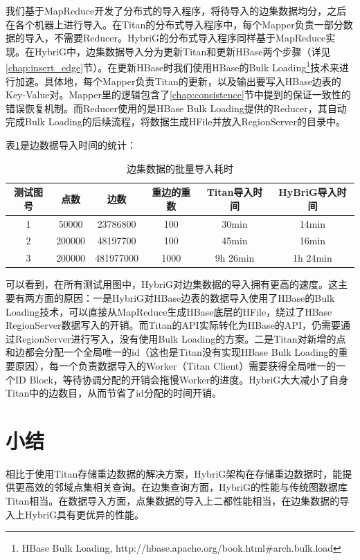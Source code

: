 我们基于MapReduce\supercite{mapreduce}开发了分布式的导入程序，将待导入的边集数据均分，之后在各个机器上进行导入。在Titan的分布式导入程序中，每个Mapper负责一部分数据的导入，不需要Reducer。HybriG的分布式导入程序同样基于MapReduce实现。在HybriG中，边集数据导入分为更新Titan和更新HBase两个步骤（详见\ref{chap:insert_edge}节）。在更新HBase时我们使用HBase的Bulk Loading\footnote{HBase Bulk Loading, http://hbase.apache.org/book.html\#arch.bulk.load}技术来进行加速。具体地，每个Mapper负责Titan的更新，以及输出要写入HBase边表的Key-Value对。Mapper里的逻辑包含了\ref{chap:consistence}节中提到的保证一致性的错误恢复机制。而Reducer使用的是HBase Bulk Loading提供的Reducer，其自动完成Bulk Loading的后续流程，将数据生成HFile并放入RegionServer的目录中。

表\ref{edge_load_perf}是边数据导入时间的统计：
\begin{table}[!hbp]
\begin{tabular}{|c|c|c|c|c|c|}
\hline
测试图号 & 点数 & 边数 & 重边的重数 & Titan导入时间 & HyBriG导入时间\\
\hline
1 & 50000 & 23786800 & 100 & 30min & 14min\\
\hline
2 & 200000 & 48197700 & 100 & 45min & 16min\\
\hline
3 & 200000 & 481977000 & 1000 & 9h 26min & 1h 24min\\
\hline
\end{tabular}
\caption{边集数据的批量导入耗时}
\label{edge_load_perf}
\end{table}

可以看到，在所有测试用图中，HybriG对边集数据的导入拥有更高的速度。这主要有两方面的原因：一是HybriG对HBase边表的数据导入使用了HBase的Bulk Loading技术，可以直接从MapReduce生成HBase底层的HFile，绕过了HBase RegionServer数据写入的开销。而Titan的API实际转化为HBase的API，仍需要通过RegionServer进行写入，没有使用Bulk Loading的方案。二是Titan对新增的点和边都会分配一个全局唯一的id（这也是Titan没有实现HBase Bulk Loading的重要原因），每一个负责数据导入的Worker（Titan Client）需要获得全局唯一的一个ID Block，等待协调分配的开销会拖慢Worker的进度。HybriG大大减小了自身Titan中的边数目，从而节省了id分配的时间开销。

\section{小结}
相比于使用Titan存储重边数据的解决方案，HybriG架构在存储重边数据时，能提供更高效的邻域点集相关查询。在边集查询方面，HybriG的性能与传统图数据库Titan相当。在数据导入方面，点集数据的导入上二都性能相当，在边集数据的导入上HybriG具有更优异的性能。


